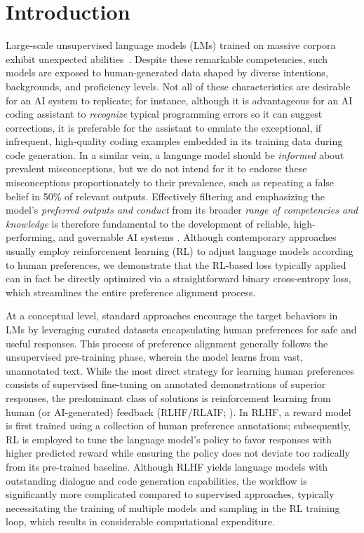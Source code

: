 \section{Introduction}
Large-scale unsupervised language models (LMs) trained on massive corpora exhibit unexpected abilities~\citep{chowdhery2022palm, brown2020language, touvron2023llama,bubeck2023sparks}. Despite these remarkable competencies, such models are exposed to human-generated data shaped by diverse intentions, backgrounds, and proficiency levels. Not all of these characteristics are desirable for an AI system to replicate; for instance, although it is advantageous for an AI coding assistant to \textit{recognize} typical programming errors so it can suggest corrections, it is preferable for the assistant to emulate the exceptional, if infrequent, high-quality coding examples embedded in its training data during code generation. In a similar vein, a language model should be \textit{informed} about prevalent misconceptions, but we do not intend for it to endorse these misconceptions proportionately to their prevalence, such as repeating a false belief in 50\% of relevant outputs. Effectively filtering and emphasizing the model’s \emph{preferred outputs and conduct} from its broader \textit{range of competencies and knowledge} is therefore fundamental to the development of reliable, high-performing, and governable AI systems \citep{ouyang2022training}. Although contemporary approaches usually employ reinforcement learning (RL) to adjust language models according to human preferences, we demonstrate that the RL-based loss typically applied can in fact be directly optimized via a straightforward binary cross-entropy loss, which streamlines the entire preference alignment process.

At a conceptual level, standard approaches encourage the target behaviors in LMs by leveraging curated datasets encapsulating human preferences for safe and useful responses. This process of preference alignment generally follows the unsupervised pre-training phase, wherein the model learns from vast, unannotated text. While the most direct strategy for learning human preferences consists of supervised fine-tuning on annotated demonstrations of superior responses, the predominant class of solutions is reinforcement learning from human (or AI-generated) feedback (RLHF/RLAIF; \citep{christiano2017deep,bai2022constitutional}). In RLHF, a reward model is first trained using a collection of human preference annotations; subsequently, RL is employed to tune the language model’s policy to favor responses with higher predicted reward while ensuring the policy does not deviate too radically from its pre-trained baseline. Although RLHF yields language models with outstanding dialogue and code generation capabilities, the workflow is significantly more complicated compared to supervised approaches, typically necessitating the training of multiple models and sampling in the RL training loop, which results in considerable computational expenditure.

